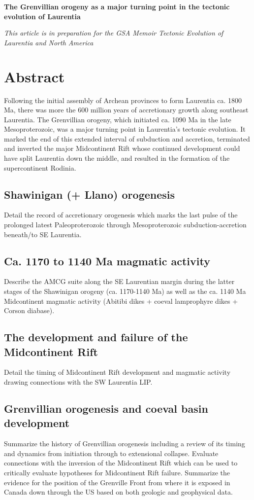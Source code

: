 \documentclass[11pt,letterpaper]{article}
\begin{document}
\begin{flushleft}
{\LARGE \textbf{The Grenvillian orogeny as a major turning point in the tectonic evolution of Laurentia}}

\noindent\textit{This article is in preparation for the GSA Memoir Tectonic Evolution of Laurentia and North America}
\end{flushleft}


\section*{Abstract}
Following the initial assembly of Archean provinces to form Laurentia ca. 1800 Ma, there was more the 600 million years of accretionary growth along southeast Laurentia. The Grenvillian orogeny, which initiated ca. 1090 Ma in the late Mesoproterozoic, was a major turning point in Laurentia's tectonic evolution. It marked the end of this extended interval of subduction and accretion, terminated and inverted the major Midcontinent Rift whose continued development could have split Laurentia down the middle, and resulted in the formation of the supercontinent Rodinia.

\subsection*{Shawinigan (+ Llano) orogenesis}
Detail the record of accretionary orogenesis which marks the last pulse of the prolonged latest Paleoproterozoic through Mesoproterozoic subduction-accretion beneath/to SE Laurentia.

\subsection*{Ca. 1170 to 1140 Ma magmatic activity}
Describe the AMCG suite along the SE Laurentian margin during the latter stages of the Shawinigan orogeny (ca. 1170-1140 Ma) as well as the ca. 1140 Ma Midcontinent magmatic activity (Abitibi dikes + coeval lamprophyre dikes + Corson diabase).

\subsection*{The development and failure of the Midcontinent Rift}
Detail the timing of Midcontinent Rift development and magmatic activity drawing connections with the SW Laurentia LIP.

\subsection*{Grenvillian orogenesis and coeval basin development}
Summarize the history of Grenvillian orogenesis including a review of its timing and dynamics from initiation through to extensional collapse. Evaluate connections with the inversion of the Midcontinent Rift which can be used to critically evaluate hypotheses for Midcontinent Rift failure. Summarize the evidence for the position of the Grenville Front from where it is exposed in Canada down through the US based on both geologic and geophysical data.
\end{document}
